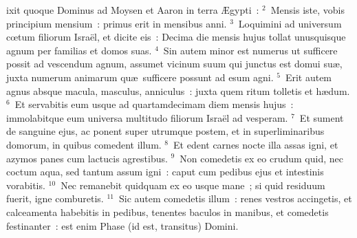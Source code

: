 \bchapter
{}ixit quoque Dominus ad Moysen et Aaron in terra \AE gypti~:
${}^{2}$~Mensis iste, vobis principium mensium~: primus erit in mensibus anni.
${}^{3}$~Loquimini ad universum cœtum filiorum Isra\"el, et dicite eis~: Decima die mensis hujus tollat unusquisque agnum per familias et domos suas.
${}^{4}$~Sin autem minor est numerus ut sufficere possit ad vescendum agnum, assumet vicinum suum qui junctus est domui su\ae , juxta numerum animarum qu\ae\ sufficere possunt ad esum agni.
${}^{5}$~Erit autem agnus absque macula, masculus, anniculus~: juxta quem ritum tolletis et h\ae dum.
${}^{6}$~Et servabitis eum usque ad quartamdecimam diem mensis hujus~: immolabitque eum universa multitudo filiorum Isra\"el ad vesperam.
${}^{7}$~Et sument de sanguine ejus, ac ponent super utrumque postem, et in superliminaribus domorum, in quibus comedent illum.
${}^{8}$~Et edent carnes nocte illa assas igni, et azymos panes cum lactucis agrestibus.
${}^{9}$~Non comedetis ex eo crudum quid, nec coctum aqua, sed tantum assum igni~: caput cum pedibus ejus et intestinis vorabitis.
${}^{10}$~Nec remanebit quidquam ex eo usque mane~; si quid residuum fuerit, igne comburetis.
${}^{11}$~Sic autem comedetis illum~: renes vestros accingetis, et calceamenta habebitis in pedibus, tenentes baculos in manibus, et comedetis festinanter~: est enim Phase (id est, transitus) Domini.


